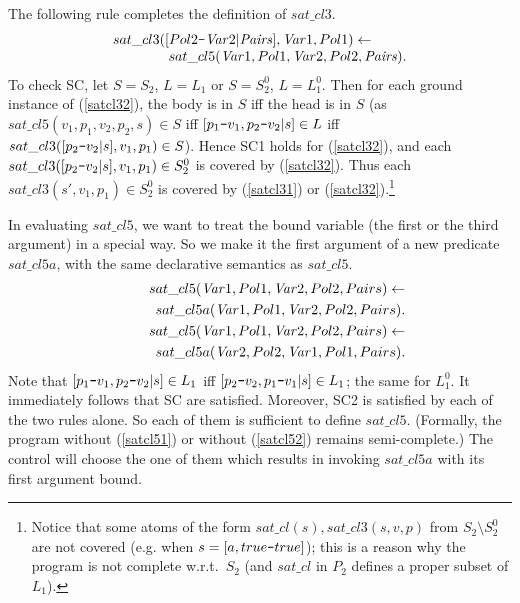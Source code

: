 \documentclass{tlp}
\newcommand*{\mydash}{{\mbox{\tt-}}}
\begin{document}
The following rule completes the definition of $sat\_cl3$.
    \begin{equation}
      \begin{array}l
         sat\_cl3([Pol2\mydash {\it Var}2 | {\it Pairs}], {\it Var}1, Pol1) \gets 
         \\
          \qquad\qquad   sat\_cl5({\it Var}1, Pol1, {\it Var}2, Pol2, {\it Pairs}). 
      \end{array}
     \label{satcl32}
    \end{equation}
To check SC, let $S=S_2$, $L=L_1$  or $S=S_2^0$, $L=L_1^0$.
Then for each ground instance of (\ref{satcl32}), the body is in $S$
iff the head is in $S$
(as
$sat\_cl5(v_1,p_1,v_2,p_2,s)\in S$ iff
$[p_1\mydash v_1,p_2\mydash v_2 | s]\in L$ iff
$sat\_cl3( [p_2\mydash v_2 | s], v_1,p_1)\in S$).
Hence SC1 holds for (\ref{satcl32}), and 
each $sat\_cl3( [p_2\mydash v_2 | s], v_1,p_1)\in S_2^0$ 
is covered by (\ref{satcl32}). 
Thus each 
$sat\_cl3(s',v_1,p_1 )\in S_2^0$ is covered by
(\ref{satcl31}) or (\ref{satcl32}).\footnote{Notice that some atoms of the form $sat\_cl(s), sat\_cl3(s,v,p)$ from
  $S_2\setminus S_2^0$  are not covered 
  (e.g. when $s = [a, true\mydash true]$);
  this is a reason why the program is not complete w.r.t.\  $S_2$
(and  $sat\_cl$ in $P_2$ defines a proper subset of $L_1$).
}





In evaluating  $sat\_cl5$,  we want to treat the bound variable
(the first or the third argument)
in a special way. 
So we make it the first argument of a new predicate
$sat\_cl5a$, with the same declarative semantics as $sat\_cl5$.
\enlargethispage*{1.7ex}
    \begin{eqnarray}
    &&
    sat\_cl5({\it Var}1, Pol1, {\it Var}2, Pol2, Pairs) \gets \nonumber
    \\&&
    \qquad
        sat\_cl5a({\it Var}1, Pol1, {\it Var}2, Pol2, Pairs).
    \label{satcl51}
    \\
    &&
    sat\_cl5({\it Var}1, Pol1, {\it Var}2, Pol2, Pairs) \gets \nonumber
    \\
    &&\qquad
        sat\_cl5a({\it Var}2, Pol2, {\it Var}1, Pol1, Pairs).
    \label{satcl52}
    \end{eqnarray}
Note that 
$[p_1\mydash v_1,p_2\mydash v_2|s]\in L_1$ iff 
$[p_2\mydash v_2,p_1\mydash v_1|s]\in L_1$; the same for $L_1^0$.
It immediately follows that SC are satisfied.
Moreover, SC2 is satisfied by each of the two rules alone.
So each of them is sufficient to define  $sat\_cl5$.
(Formally, the program without (\ref{satcl51}) or without (\ref{satcl52})
remains semi-complete.) 
   The control will choose the one of them which results in invoking $sat\_cl5a$
   with its first argument bound.
\end{document}
